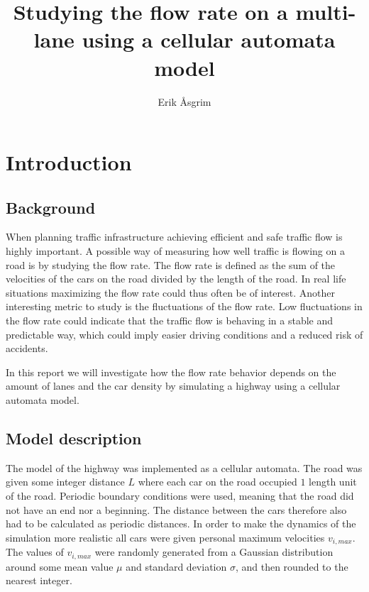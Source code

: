 \documentclass[a4paper,12pt]{article}
\title{Studying the flow rate on a multi-lane using a cellular automata model}
\author{Erik Åsgrim}
\begin{document}
\maketitle

\section*{Introduction}
\subsection*{Background}
When planning traffic infrastructure achieving efficient and safe traffic flow is highly important.
A possible way of measuring how well traffic is flowing on a road is by studying the flow rate.
The flow rate is defined as the sum of the velocities of the cars on the road divided by the length of the road.
In real life situations maximizing the flow rate could thus often be of interest. Another interesting metric to study is the fluctuations of the 
flow rate. Low fluctuations in the flow rate could indicate that the traffic flow is behaving in a stable and predictable way, 
which could imply easier driving conditions and a reduced risk of accidents.

In this report we will investigate how the flow rate behavior depends on the amount of lanes and the car density by simulating
a highway using a cellular automata model.

\subsection*{Model description}
The model of the highway was implemented as a cellular automata. The road was given some integer distance $L$ where each car on the road occupied $1$ length unit of the road. 
Periodic boundary conditions were used, meaning that the road did not have an end nor a beginning. The distance between the cars therefore also had to be calculated as periodic distances.
In order to make the dynamics of the simulation more realistic all cars were given personal maximum velocities $v_{i,max}$. The values of $v_{i, max}$ were randomly generated 
from a Gaussian distribution around some mean value $\mu$ and standard deviation $\sigma$, and then rounded to the nearest integer.
\end{document}
